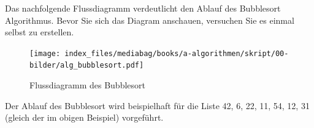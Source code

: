 \documentclass[
  letterpaper,
  DIV=11,
  numbers=noendperiod]{scrreprt}
\begin{document}
Das nachfolgende Flussdiagramm verdeutlicht den Ablauf des Bubblesort
Algorithmus. Bevor Sie sich das Diagram anschauen, versuchen Sie es
einmal selbst zu erstellen.

\begin{tcolorbox}[enhanced jigsaw, bottomtitle=1mm, colbacktitle=quarto-callout-caution-color!10!white, colback=white, opacityback=0, arc=.35mm, left=2mm, toprule=.15mm, title=\textcolor{quarto-callout-caution-color}{\faFire}\hspace{0.5em}{Flussdiagramm: Bubblesort}, coltitle=black, toptitle=1mm, leftrule=.75mm, opacitybacktitle=0.6, breakable, titlerule=0mm, rightrule=.15mm, bottomrule=.15mm, colframe=quarto-callout-caution-color-frame]

\begin{figure}[H]

{\centering \texttt{[image: index\_files/mediabag/books/a-algorithmen/skript/00-bilder/alg\_bubblesort.pdf]}

}

\caption{Flussdiagramm des Bubblesort}

\end{figure}%

\end{tcolorbox}

Der Ablauf des Bubblesort wird beispielhaft für die Liste 42, 6, 22, 11,
54, 12, 31 (gleich der im obigen Beispiel) vorgeführt.
\end{document}

